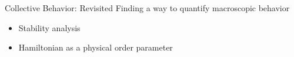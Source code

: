 
\begin{frame}{Collective Behavior: Revisited}
    Finding a way to quantify macroscopic behavior
    \begin{itemize}
        \item Stability analysis \cite{tordeux2022multi}
        \item Hamiltonian as a physical order parameter \cite{rudiger2024stability}
    \end{itemize}
\end{frame}
